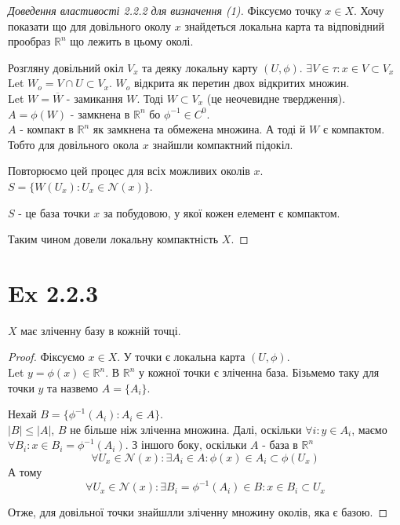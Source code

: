 \documentclass[10pt, a4paper]{article} %
\newcommand{\R}{\mathbb{R}}
\begin{document}
\begin{proof}[Доведення властивості 2.2.2 для визначення (1)]
    Фіксуємо точку $x\in X$.
    Хочу показати що для довільного околу $x$ знайдеться локальна карта та відповідний 
    прообраз $\R^n$ що лежить в цьому околі. 
    
    Розгляну довільний окіл $V_x$ та деяку локальну карту $(U,\phi)$.
    $\exists V\in\tau: x\in V \subset V_x$\\
    Let $W_o = V \cap U \subset V_x$. $W_o$ відкрита як перетин двох відкритих множин.\\
    Let $W = \overline W$ - замикання $W$. Тоді $W \subset V_x$ (це неочевидне твердження).\\
    $A = \phi(W)$ - замкнена в $\R^n$ бо $\phi^{-1} \in C^0$.\\
    $A$ - компакт в $\R^n$ як замкнена та обмежена множина.
    А тоді й $W$ є компактом.
    Тобто для довільного окола $x$ знайшли компактний підокіл.

    Повторюємо цей процес для всіх можливих околів $x$.
    $S = \{W(U_x) : U_x \in \mathcal N(x)\}$.

    $S$ - це база точки $x$ за побудовою, у якої кожен елемент є компактом.

    Таким чином довели локальну компактність $X$.
\end{proof}

\section*{Ex 2.2.3}
\begin{mdframed}
    $X$ має зліченну базу в кожній точці.
\end{mdframed}

\begin{proof}
    Фіксуємо $x\in X$. У точки є локальна карта $(U,\phi)$.\\
    Let $y = \phi(x) \in \R^n$.
    В $\R^n$ у кожної точки є зліченна база. Бізьмемо таку для точки $y$ та назвемо $A = \{A_i\}$.

    Нехай $B = \{\phi^{-1}(A_i) : A_i \in A\}$.\\
    $|B| \le |A|$, $B$ не більше ніж зліченна множина.
    Далі, оскільки $\forall i: y\in A_i$, маємо $\forall B_i: x \in B_i = \phi^{-1}(A_i)$.
    З іншого боку, оскільки $A$ - база в $\R^n$
    \[\forall U_x \in \mathcal{N}(x): \exists A_i \in A: \phi(x) \in A_i \subset \phi(U_x)\]
    А тому
    \[\forall U_x \in \mathcal{N}(x): \exists B_i=\phi^{-1}(A_i) \in B: x \in B_i \subset U_x\]
    
    Отже, для довільної точки знайшлли зліченну множину околів, яка є базою.
\end{proof}
\end{document}
